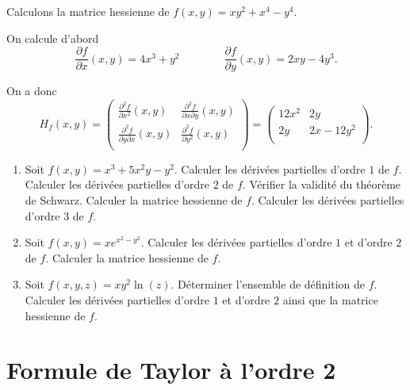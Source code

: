 \documentclass[11pt, class=report,crop=false]{standalone}
\begin{document}
\begin{exemple}
Calculons la matrice hessienne de $f(x,y) = xy^2 + x^4 - y^4$.

On calcule d'abord 
$$\frac{\partial f}{\partial x}(x,y) = 4x^3 + y^2
\qquad\qquad
\frac{\partial f}{\partial y}(x,y) = 2xy - 4y^3.$$

On a donc 
$$H_f(x,y)
= \begin{pmatrix}
    \frac{\partial ^2f}{\partial x^2}(x,y) & \frac{\partial ^2f}{\partial x\partial y}(x,y) \\
    \frac{\partial ^2f}{\partial y\partial x}(x,y) & \frac{\partial ^2f}{\partial y^2}(x,y) \\
\end{pmatrix}
= 
\begin{pmatrix}
12x^2 & 2y \\
2y      & 2x - 12y^2 \\
\end{pmatrix}.$$
\end{exemple}


\begin{miniexercices}
    \sauteligne
    \begin{enumerate}
        \item Soit $f(x,y) = x^3+5x^2y-y^2$. Calculer les dérivées partielles d'ordre $1$ de $f$. Calculer les dérivées partielles d'ordre $2$ de $f$. Vérifier la validité du théorème de Schwarz. Calculer la matrice hessienne de $f$. Calculer les dérivées partielles d'ordre $3$ de $f$.
        
        \item Soit $f(x,y) = xe^{x^2-y^2}$. Calculer les dérivées partielles d'ordre $1$ et d'ordre $2$ de $f$. Calculer la matrice hessienne de $f$.
        
        \item Soit $f(x,y,z) = xy^2 \ln(z)$. Déterminer l'ensemble de définition de $f$. Calculer les dérivées partielles d'ordre $1$ et d'ordre $2$ ainsi que la matrice hessienne de $f$.                
    \end{enumerate}
\end{miniexercices}


\section{Formule de Taylor à l'ordre 2}

\end{document}
